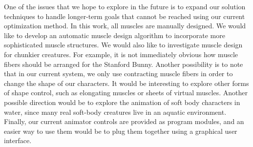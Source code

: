 One of the issues that we hope to explore in the future is to expand
our solution techniques to handle longer-term goals that cannot be
reached using our current optimization method. In this work, all muscles are manually designed. We would like to develop an automatic muscle design algorithm to incorporate more sophisticated muscle structures.
We would also like to
investigate muscle design for chunkier creatures. For example, it is
not immediately obvious how muscle fibers should be arranged for the
Stanford Bunny. Another possibility is to note that in our current
system, we only use contracting muscle fibers in order to change the
shape of our characters.  It would be interesting to explore other
forms of shape control, such as elongating muscles or sheets of
virtual muscles.  Another possible direction would be to explore the
animation of soft body characters in water, since many real soft-body
creatures live in an aquatic environment.  Finally, our current
animator controls are provided as program modules, and an easier way
to use them would be to plug them together using a graphical user
interface.
